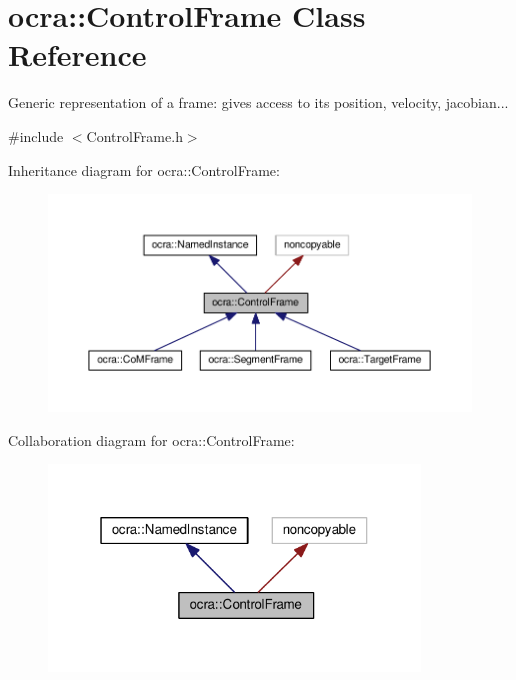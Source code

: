 \hypertarget{classocra_1_1ControlFrame}{}\section{ocra\+:\+:Control\+Frame Class Reference}
\label{classocra_1_1ControlFrame}


Generic representation of a frame\+: gives access to its position, velocity, jacobian...  




{\ttfamily \#include $<$Control\+Frame.\+h$>$}



Inheritance diagram for ocra\+:\+:Control\+Frame\+:
\nopagebreak
\begin{figure}[H]
\begin{center}
\leavevmode
\includegraphics[width=350pt]{d6/d24/classocra_1_1ControlFrame__inherit__graph}
\end{center}
\end{figure}


Collaboration diagram for ocra\+:\+:Control\+Frame\+:
\nopagebreak
\begin{figure}[H]
\begin{center}
\leavevmode
\includegraphics[width=280pt]{df/dde/classocra_1_1ControlFrame__coll__graph}
\end{center}
\end{figure}
